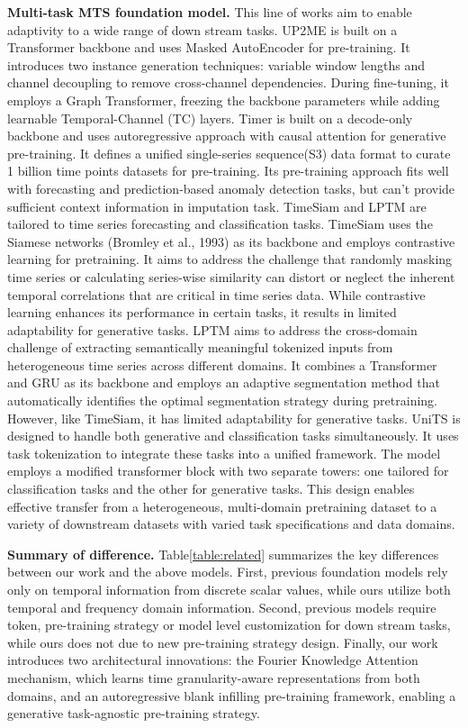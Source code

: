 {\bf Multi-task MTS foundation model.} 
This line of works aim to enable adaptivity to a wide 
range of down stream tasks.
UP2ME\cite{Zhang24} is built on a Transformer backbone and 
uses Masked AutoEncoder for pre-training.  
It introduces two instance generation techniques: variable window lengths and channel decoupling to remove cross-channel dependencies. During fine-tuning, it employs a Graph Transformer, freezing the backbone parameters while adding learnable Temporal-Channel (TC) layers. 
Timer\cite{Liu24} is built on a decode-only backbone and uses autoregressive approach with causal attention 
for generative pre-training. 
It defines a unified single-series sequence(S3) data format to curate 1 billion time points datasets for pre-training.  
Its pre-training approach fits well with forecasting and prediction-based anomaly detection tasks, but can’t provide sufficient context information in imputation task.  
TimeSiam \cite{Dong24} and LPTM\cite{Kamarthi23} are 
tailored to time series forecasting and classification tasks. 
TimeSiam uses the 
Siamese networks (Bromley et al., 1993) as its backbone and employs contrastive learning for pretraining. It aims to address the challenge that randomly masking time series or calculating series-wise similarity can distort or neglect the inherent temporal correlations that are critical in time series data. While contrastive learning enhances its performance in certain tasks, it results in limited adaptability for generative tasks.
LPTM\cite{Kamarthi23} aims to address the cross-domain challenge of extracting semantically meaningful tokenized inputs from heterogeneous time series across different domains. It combines a Transformer and GRU as its backbone and employs an adaptive segmentation method that automatically identifies the optimal segmentation strategy during pretraining. However, like TimeSiam, it has limited adaptability for generative tasks.   
UniTS \cite{gao24} is designed to handle both generative and classification tasks simultaneously. It uses task tokenization to integrate these tasks into a unified framework. The model employs a modified transformer block with two separate towers: one tailored for classification tasks and the other for generative tasks. This design enables effective transfer from a heterogeneous, multi-domain pretraining dataset to a variety of downstream datasets with varied task specifications and data domains.

 
{\bf Summary of difference.}   
Table\ref{table:related} summarizes the key differences between our work and the above models.
First, previous foundation models rely only on temporal information from discrete scalar values, while ours utilize both temporal and frequency domain information. 
Second, previous models require token, pre-training strategy or model level customization for down stream tasks, 
while ours does not due to new pre-training strategy design.   
Finally, our work introduces two architectural innovations: the Fourier Knowledge Attention mechanism, which learns time granularity-aware representations from both domains, and an autoregressive blank infilling pre-training framework, enabling a generative task-agnostic pre-training strategy. 





 
